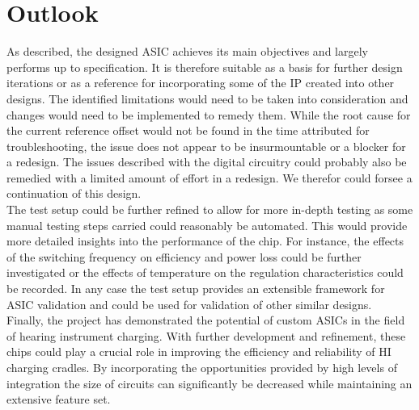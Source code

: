 \section{Outlook}
\label{chap:outlook}
As described, the designed \ac{ASIC} achieves its main objectives and largely performs up to specification. It is therefore suitable as a basis for further design iterations or as a reference for incorporating some of the IP created into other designs. The identified limitations would need to be taken into consideration and changes would need to be implemented to remedy them. While the root cause for the current reference offset would not be found in the time attributed for troubleshooting, the issue does not appear to be insurmountable or a blocker for a redesign. The issues described with the digital circuitry could probably also be remedied with a limited amount of effort in a redesign. We therefor could forsee a continuation of this design.\\
The test setup could be further refined to allow for more in-depth testing as some manual testing steps carried could reasonably be automated. This would provide more detailed insights into the performance of the chip. For instance, the effects of the switching frequency on efficiency and power loss could be further investigated or the effects of temperature on the regulation characteristics could be recorded. In any case the test setup provides an extensible framework for \ac{ASIC} validation and could be used for validation of other similar designs. \\
Finally, the project has demonstrated the potential of custom \ac{ASIC}s in the field of hearing instrument charging. With further development and refinement, these chips could play a crucial role in improving the efficiency and reliability of HI charging cradles. By incorporating the opportunities provided by high levels of integration the size of circuits can significantly be decreased while maintaining an extensive feature set. 
\clearpage